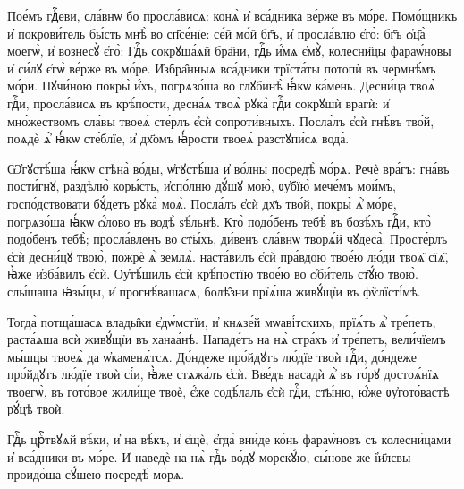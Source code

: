 
\label{proroch}  

\cuLettrine
Пое́мъ 
%
гдⷭ҇еви, сла́внѡ бо просла́висѧ: конѧ̀ и҆  вса́дника ве́рже въ мо́ре.
\hKv Помо́щникъ и҆ покрови́тель  бы́сть мнѣ̀ во сп҃се́нїе: се́й мо́й бг҃ъ, и҆ просла́влю  є҆го̀: бг҃ъ ѻ҆ц҃а̀ моегѡ̀, и҆ вознесꙋ̀ є҆го̀: 
\hKv Гдⷭ҇ь  сокрꙋша́ѧй бра̑ни, гдⷭ҇ь и҆́мѧ є҆мꙋ̀, колесни̑цы фараѡ́новы  и҆ си́лꙋ є҆гѡ̀ ве́рже въ мо́ре. 
\hKv И҆збра̑нныѧ вса́дники  трїста́ты потопѝ въ чермнѣ́мъ мо́ри. 
\hKv Пꙋчи́ною покры̀  и҆́хъ, погрѧзо́ша во глꙋбинѣ̀ ꙗ҆́кѡ ка́мень. 
\hKv Десни́ца  твоѧ̀ гдⷭ҇и, просла́висѧ въ крѣ́пости, десна́ѧ твоѧ̀ рꙋка̀  гдⷭ҇и сокрꙋшѝ врагѝ: и҆ мно́жествомъ сла́вы твоеѧ̀ сте́рлъ  є҆сѝ сопроти́вныхъ. 
\hKv Посла́лъ є҆сѝ гнѣ́въ тво́й,   поѧдѐ ѧ҆̀ ꙗ҆́кѡ сте́блїе,  и҆ дх҃омъ ꙗ҆́рости твоеѧ̀ разстꙋпи́сѧ вода̀. 
%

\hKv Ѡ҆гꙋстѣ́ша ꙗ҆́кѡ стѣна̀ во́ды, ѡ҆гꙋстѣ́ша  и҆ во́лны посредѣ̀ мо́рѧ. 
\hKv Речѐ вра́гъ: гна́въ  пости́гнꙋ, раздѣлю̀ коры́сть, и҆спо́лню дꙋ́шꙋ мою̀,  ᲂу҆бїю̀ мече́мъ мои́мъ, госпо́дствовати бꙋ́детъ рꙋка̀ моѧ̀.  
\hKv Посла́лъ є҆сѝ дх҃ъ тво́й, покры̀ ѧ҆̀ мо́ре,  погрѧзо́ша ꙗ҆́кѡ ѻ҆́лово въ водѣ̀ ѕѣ́льнѣ. 
\hKv Кто̀  подо́бенъ тебѣ̀ въ бозѣ́хъ гдⷭ҇и, кто̀ подо́бенъ тебѣ̀;  просла́вленъ во ст҃ы́хъ, ди́венъ сла́внѡ творѧ́й чꙋдеса̀.  
\hKv Просте́рлъ є҆сѝ десни́цꙋ твою̀, пожрѐ ѧ҆̀ землѧ̀.  наста́вилъ є҆сѝ пра́вдою твое́ю лю́ди твоѧ̑ сїѧ̑, ꙗ҆̀же  и҆зба́вилъ є҆сѝ. 
\hKv Оу҆тѣ́шилъ є҆сѝ крѣ́постїю  твое́ю во ѻ҆би́тель ст҃ꙋ́ю твою̀. слы́шаша ꙗ҆зы́цы, и҆  прогнѣ́вашасѧ, болѣ̑зни прїѧ́ша живꙋ́щїи въ фѷлїсті́мѣ. 
%

\hKv Тогда̀ потща́шасѧ влады̑ки є҆дѡ́мстїи, и҆  кнѧзе́й мѡаві́тскихъ, прїѧ́тъ ѧ҆̀ тре́петъ, раста́ѧша всѝ  живꙋ́щїи въ ханаа́нѣ.  
\hKv  Нападе́тъ на нѧ̀ стра́хъ и҆ тре́петъ, вели́чїемъ мы́шцы  твоеѧ̀ да ѡ҆каменѧ́тсѧ. 
\hKv До́ндеже про́йдꙋтъ лю́дїе  твоѝ гдⷭ҇и, до́ндеже про́йдꙋтъ лю́дїе твоѝ сі́и, ꙗ҆̀же  стѧжа́лъ є҆сѝ. 
\hKv Вве́дъ насадѝ ѧ҆̀ въ го́рꙋ  достоѧ́нїѧ твоегѡ̀, въ гото́вое жили́ще твоѐ, є҆́же  содѣ́лалъ є҆сѝ гдⷭ҇и, ст҃ы́ню, ю҆́же ᲂу҆гото́вастѣ  рꙋ́цѣ твоѝ. 
%

\hKv Гдⷭ҇ь црⷭ҇твꙋѧй вѣ́ки, и҆ на вѣ́къ, и҆  є҆щѐ, є҆гда̀ вни́де ко́нь фараѡ́новъ съ колесни́цами и҆  вса́дники въ мо́ре. 
\hKv И҆ наведѐ на нѧ̀ гдⷭ҇ь во́дꙋ  морскꙋ́ю, сы́нове же і҆и҃лєвы проидо́ша сꙋ́шею посредѣ̀  мо́рѧ. 
%


